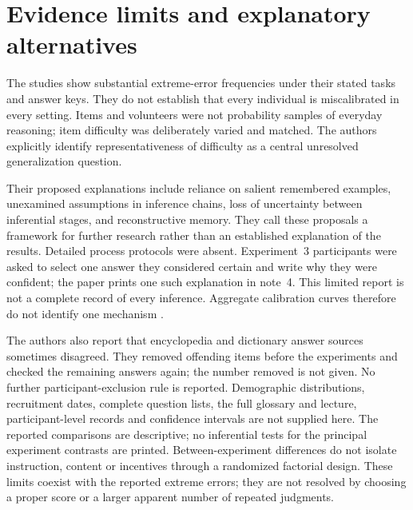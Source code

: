 \section{Evidence limits and explanatory alternatives}
\label{sec:p19-certainty-evidence-limits}

The studies show substantial extreme-error frequencies under their stated
tasks and answer keys. They do not establish that every individual is
miscalibrated in every setting. Items and volunteers were not probability
samples of everyday reasoning; item difficulty was deliberately varied and
matched. The authors explicitly identify representativeness of difficulty
as a central unresolved generalization question.

Their proposed explanations include reliance on salient remembered examples,
unexamined assumptions in inference chains, loss of uncertainty between
inferential stages, and reconstructive memory. They call these proposals
a framework for further research rather than an established explanation
of the results. Detailed process protocols were absent. Experiment~3
participants were asked to select one answer they considered certain and
write why they were confident; the paper prints one such explanation in
note~4. This limited report is not a complete record of every inference.
Aggregate calibration curves therefore do not identify one mechanism
\cite[pp.~561--564]{FischhoffSlovicLichtenstein1977Certainty}.

The authors also report that encyclopedia and dictionary answer sources
sometimes disagreed. They removed offending items before the experiments
and checked the remaining answers again; the number removed is not given.
No further participant-exclusion rule is reported. Demographic distributions,
recruitment dates, complete question lists, the full glossary and lecture,
participant-level records and confidence intervals are not supplied here.
The reported comparisons are descriptive; no inferential tests for the
principal experiment contrasts are printed. Between-experiment differences
do not isolate instruction, content or incentives through a randomized
factorial design. These limits coexist with the reported extreme errors;
they are not resolved by choosing a proper score or a larger apparent
number of repeated judgments.
